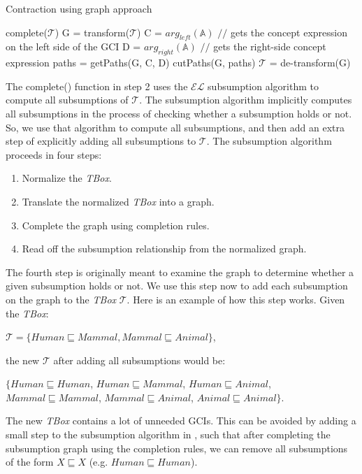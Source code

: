 \begin{algorithm}
\caption{Contraction using graph approach}
\label{GraphContract}
\begin{algorithmic}[1]
\State complete($ \mathcal{T} $)
\State G = transform($ \mathcal{T} $)
\State C = $arg_{left}(\mathbb{A})$ $//$ gets the concept expression on the left side of the GCI
\State D = $arg_{right}(\mathbb{A})$ $//$ gets the right-side concept expression
\State paths = getPaths(G, C, D)
\State cutPaths(G, paths)
\State $ \mathcal{T} $ = de-transform(G)
\EndFunction
\end{algorithmic}
\end{algorithm}

The complete() function in step 2 uses the $\mathcal{EL}$ subsumption algorithm to compute all subsumptions of $\mathcal{T}$. The subsumption algorithm implicitly computes all subsumptions in the process of checking whether a subsumption holds or not. So, we use that algorithm to compute all subsumptions, and then add an extra step of explicitly adding all subsumptions to $\mathcal{T}$. The subsumption algorithm proceeds in four steps:\cite{new}
\begin{enumerate}
\item Normalize the \textit{TBox}.
\item Translate the normalized \textit{TBox} into a graph.
\item Complete the graph using completion rules.
\item Read off the subsumption relationship from the normalized graph.
\end{enumerate}
The fourth step is originally meant to examine the graph to determine whether a given subsumption holds or not. We use this step now to add each subsumption on the graph to the \textit{TBox} $\mathcal{T}$. Here is an example of how this step works. Given the \textit{TBox}:
\begin{center} 
$\mathcal{T} = \{Human \sqsubseteq Mammal, Mammal \sqsubseteq Animal\}$, 
\end{center}
the new $\mathcal{T}$ after adding all subsumptions would be: 
\begin{center}
$\{Human \sqsubseteq Human$, $Human \sqsubseteq Mammal$, $Human \sqsubseteq Animal$, $Mammal \sqsubseteq Mammal$, $Mammal \sqsubseteq Animal$, $Animal \sqsubseteq Animal\}$. 
\end{center}
The new \textit{TBox} contains a lot of unneeded GCIs. This can be avoided by adding a small step to the subsumption algorithm in \cite{small}, such that after completing the subsumption graph using the completion rules, we can remove all subsumptions of the form $X \sqsubseteq X$ (e.g. $Human \sqsubseteq Human$).

